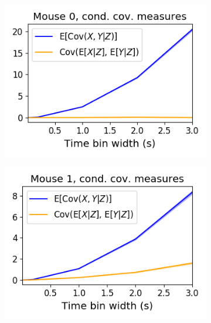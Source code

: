  \begin{figure}[h]
    \begin{subfigure}[h]{0.5\linewidth}
      \includegraphics[width=\linewidth]{figures/eight_probe/Krebs_cond_cov_comparison.png}
      \label{fig:Krebs_cond_cov_comparison}
    \end{subfigure}
    \begin{subfigure}[h]{0.5\linewidth}
      \includegraphics[width=\linewidth]{figures/eight_probe/Waksman_cond_cov_comparison.png}
      \label{fig:Waksman_cond_cov_comparison}
    \end{subfigure}
    \begin{subfigure}[h]{0.5\linewidth}

\end{subfigure}
\end{figure}
